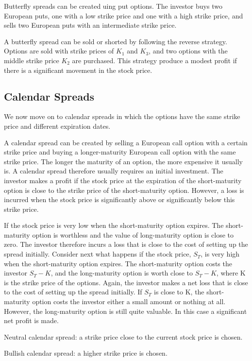 \documentclass{article}
\begin{document}
Butterfly spreads can be created uing put options. The investor buys two European puts, one with a low strike price and one with a high strike price, and sells two European puts with an intermediate strike price.

A butterfly spread can be sold or shorted by following the reverse strategy. Options are sold with strike prices of $ K_1 $ and $ K_3 $, and two options with the middle strike price $ K_2 $ are purchased. This strategy produce a modest profit if there is a significant movement in the stock price.

\subsection{Calendar Spreads}
We now move on to calendar spreads in which the options have the same strike price and different expiration dates.

A calendar spread can be created by selling a European call option with a certain strike price and buying a longer-maturity European call option with the same strike price. The longer the maturity of an option, the more expensive it usually is. A calendar spread therefore usually requires an initial investment. The investor makes a profit if the stock price at the expiration of the short-maturity option is close to the strike price of the short-maturity option. However, a loss is incurred when the stock price is significantly above or significantly below this strike price.

If the stock price is very low when the short-maturity option expires. The short-maturity option is worthless and the value of long-maturity option is close to zero. The investor therefore incurs a loss that is close to the cost of setting up the spread initially. Consider next what happens if the stock price, $ S_T $, is very high when the short-maturity option expires. The short-maturity option costs the investor $ S_T-K $, and the long-maturity option is worth close to $ S_T-K $, where K is the strike price of the options. Again, the investor makes a net loss that is close to the cost of setting up the spread initially. If $ S_T $ is close to K, the short-maturity option costs the investor either a small amount or nothing at all. However, the long-maturity option is still quite valuable. In this case a significant net profit is made.

Neutral calendar spread: a strike price close to the current stock price is chosen.

Bullish calendar spread: a higher strike price is chosen.
\end{document}
